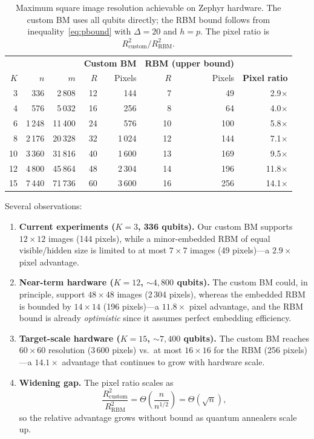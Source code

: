 \documentclass[11pt,a4paper]{article}
\begin{document}
\begin{table}[h]
\centering
\caption{Maximum square image resolution achievable on Zephyr hardware.  The custom BM uses all qubits directly; the RBM bound follows from inequality~\eqref{eq:pbound} with $\Delta=20$ and $h=p$.  The pixel ratio is $R_{\mathrm{custom}}^2 / R_{\mathrm{RBM}}^2$.}
\label{tab:scalability}
\begin{tabular}{@{}rrr|rr|rr|r@{}}
\toprule
& & & \multicolumn{2}{c|}{\textbf{Custom BM}} & \multicolumn{2}{c|}{\textbf{RBM (upper bound)}} & \\
$K$ & $n$ & $m$ & $R$ & Pixels & $R$ & Pixels & \textbf{Pixel ratio} \\
\midrule
3  &    336 &  2\,808 &  12 &   144 &  7 &  49 & 2.9$\times$ \\
4  &    576 &  5\,032 &  16 &   256 &  8 &  64 & 4.0$\times$ \\
6  &  1\,248 & 11\,400 &  24 &   576 & 10 & 100 & 5.8$\times$ \\
8  &  2\,176 & 20\,328 &  32 & 1\,024 & 12 & 144 & 7.1$\times$ \\
10 &  3\,360 & 31\,816 &  40 & 1\,600 & 13 & 169 & 9.5$\times$ \\
12 &  4\,800 & 45\,864 &  48 & 2\,304 & 14 & 196 & 11.8$\times$ \\
15 &  7\,440 & 71\,736 &  60 & 3\,600 & 16 & 256 & 14.1$\times$ \\
\bottomrule
\end{tabular}
\end{table}

Several observations:

\begin{enumerate}
  \item \textbf{Current experiments ($K=3$, 336 qubits).}  Our custom BM supports $12\times 12$ images (144 pixels), while a minor-embedded RBM of equal visible/hidden size is limited to at most $7\times 7$ images (49 pixels)---a $2.9\times$ pixel advantage.

  \item \textbf{Near-term hardware ($K=12$, $\sim\!4{,}800$ qubits).}  The custom BM could, in principle, support $48\times 48$ images (2\,304 pixels), whereas the embedded RBM is bounded by $14\times 14$ (196 pixels)---a $\mathbf{11.8\times}$ pixel advantage, and the RBM bound is already \emph{optimistic} since it assumes perfect embedding efficiency.

  \item \textbf{Target-scale hardware ($K=15$, $\sim\!7{,}400$ qubits).}  The custom BM reaches $60\times 60$ resolution (3\,600 pixels) vs.\ at most $16\times 16$ for the RBM (256 pixels)---a $\mathbf{14.1\times}$ advantage that continues to grow with hardware scale.

  \item \textbf{Widening gap.}  The pixel ratio scales as
  \[
    \frac{R_{\mathrm{custom}}^2}{R_{\mathrm{RBM}}^2} = \Theta\!\left(\frac{n}{n^{1/2}}\right) = \Theta\!\left(\sqrt{n}\right),
  \]
  so the relative advantage grows without bound as quantum annealers scale up.
\end{enumerate}
\end{document}
